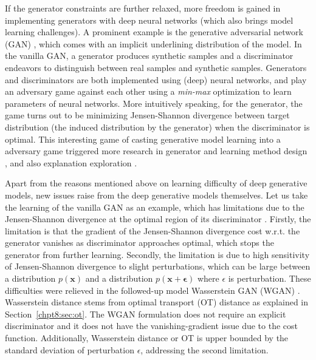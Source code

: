 If the generator constraints are further relaxed, more freedom is gained in implementing generators with deep neural networks (which also brings model learning challenges). A prominent example is the generative adversarial network (GAN) \cite{NIPS2014_5423}, which comes with an implicit underlining distribution of the model.
In the vanilla GAN, a generator produces synthetic samples and a discriminator endeavors to distinguish between real samples and synthetic samples. Generators and discriminators are both implemented using (deep) neural networks, and play an adversary game against each other using a \textit{min-max} optimization to learn parameters of neural networks. More intuitively speaking, for the generator, the game turns out to be minimizing Jensen-Shannon divergence between target distribution (the induced distribution by the generator) when the discriminator is optimal.
This interesting game of casting generative model learning into a adversary game triggered more research in generator and learning method design
\cite{2015arXiv151106434R, 2015arXiv151106434R, 2018arXiv180205957M, 2018arXiv180508318Z, 2018arXiv180600880K, bang2018icml, DBLP:journals/corr/GhoshKNTD17, hoang2018mgan}, and also explanation exploration \cite{2017arXiv170104862A, 2017arXiv170107875A, 2018arXiv180607755X, 2017arXiv170104722M, NIPS2016_6399, li2018graphical}.

Apart from the reasons mentioned above on learning difficulty of deep generative models, new issues raise from the deep generative models themselves. Let us take the learning of the vanilla GAN as an example, which has limitations due to the Jensen-Shannon divergence at the optimal region of its discriminator \cite{2017arXiv170104862A}. Firstly, the limitation is that the gradient of the Jensen-Shannon divergence cost w.r.t. the generator vanishes as discriminator approaches optimal, which stops the generator from further learning. Secondly, the limitation is due to high sensitivity of Jensen-Shannon divergence to slight perturbations, which can be large between a distribution $p(\bm{x})$ and a distribution $p(\bm{x}+\bm{\epsilon})$ where $\epsilon$ is perturbation. These difficulties were relieved in the followed-up model Wasserstein GAN (WGAN) \cite{2017arXiv170107875A}. Wasserstein distance stems from optimal transport (OT) distance as explained in Section~\ref{chpt8:sec:ot}. The WGAN formulation does not require an explicit discriminator and it does not have the vanishing-gradient issue due to the cost function. Additionally, Wasserstein distance or OT is upper bounded by the standard deviation of perturbation $\epsilon$, addressing the second limitation.

